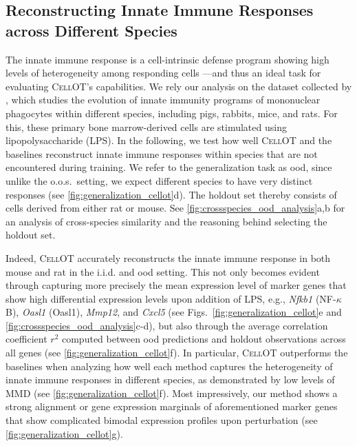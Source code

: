 \subsection{Reconstructing Innate Immune Responses across Different Species}

The innate immune response is a cell-intrinsic defense program showing high levels of heterogeneity among responding cells ---and thus an ideal task for evaluating \textsc{CellOT}'s capabilities. We rely our analysis on the dataset collected by \citet{hagai2018gene}, which studies the evolution of innate immunity programs of mononuclear phagocytes within different species, including pigs, rabbits, mice, and rats. For this, these primary bone marrow-derived cells are stimulated using lipopolysaccharide (LPS).
In the following, we test how well \textsc{CellOT} and the baselines reconstruct innate immune responses within species that are not encountered during training. We refer to the generalization task as \acrfull{ood}, since unlike the o.o.s.~setting, we expect different species to have very distinct responses (see \cref{fig:generalization_cellot}d).
The holdout set thereby consists of cells derived from either rat or mouse. See \cref{fig:crossspecies_ood_analysis}a,b for an analysis of cross-species similarity and the reasoning behind selecting the holdout set.

Indeed, \textsc{CellOT} accurately reconstructs the innate immune response in both mouse and rat in the i.i.d. and \acrshort{ood} setting. This not only becomes evident through capturing more precisely the mean expression level of marker genes that show high differential expression levels upon addition of LPS, e.g., \textit{Nfkb1} (NF-$\kappa$B), \textit{Oasl1} (Oasl1), \textit{Mmp12}, and \textit{Cxcl5} (see Figs.~\ref{fig:generalization_cellot}e and \ref{fig:crossspecies_ood_analysis}c-d), but also through the average correlation coefficient $r^2$ computed between \acrshort{ood} predictions and holdout observations across all genes (see \cref{fig:generalization_cellot}f).
In particular, \textsc{CellOT} outperforms the baselines when analyzing how well each method captures the heterogeneity of innate immune responses in different species, as demonstrated by low levels of \acrshort{MMD} (see \cref{fig:generalization_cellot}f).
Most impressively, our method shows a strong alignment or gene expression marginals of aforementioned marker genes that show complicated bimodal expression profiles upon perturbation (see \cref{fig:generalization_cellot}g).


